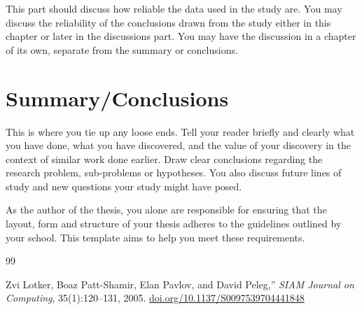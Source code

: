 \documentclass[english, 12pt, a4paper, sci, utf8, a-2b, online]{aaltothesis}
\begin{document}
This part should discuss how reliable the data used in the study are. You may 
discuss the reliability of the conclusions drawn from the study either in this 
chapter or later in the discussions part. You may have the discussion in a 
chapter of its own, separate from the summary or conclusions.


\clearpage

\section{Summary/Conclusions}
\label{sec:summary}

This is where you tie up any loose ends. Tell your reader briefly and clearly 
what you have done, what you have discovered, and the value of your discovery 
in the context of similar work done earlier. Draw clear conclusions regarding 
the research problem, sub-problems or hypotheses. You also discuss future lines 
of study and new questions your study might have posed.

As the author of the thesis, you alone are responsible for ensuring that the 
layout, form and structure of your thesis adheres to the guidelines outlined by 
your school. This template aims to help you meet these requirements.



\clearpage
\thesisbibliography

\begin{thebibliography}{99}

	\item[{[1]}] Zvi Lotker, Boaz Patt-Shamir, Elan Pavlov, and David Peleg,” 
	\textit{SIAM Journal on Computing}, 35(1):120–131, 2005.
	\url{doi.org/10.1137/S0097539704441848}
\end{thebibliography}
\end{document}
